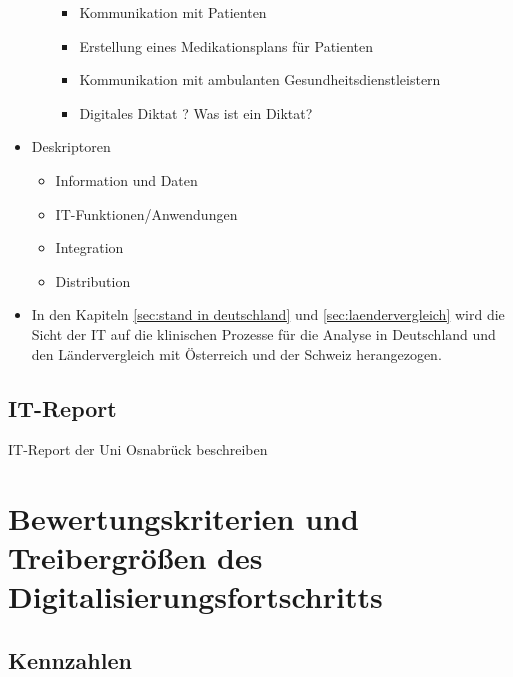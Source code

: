\begin{itemize}
\begin{itemize}
				\begin{itemize}
					\item Kommunikation mit Patienten
					\item Erstellung eines Medikationsplans für Patienten
					\item Kommunikation mit ambulanten Gesundheitsdienstleistern
					\item Digitales Diktat ? Was ist ein Diktat?
				\end{itemize}
			\end{itemize}
			\item Deskriptoren
		\begin{itemize} 
			\item Information und Daten
			\item IT-Funktionen/Anwendungen
			\item Integration
			\item Distribution
		\end{itemize}
		\item In den Kapiteln \ref{sec:stand in deutschland} und \ref{sec:laendervergleich} wird die Sicht der IT auf die klinischen Prozesse für die Analyse in Deutschland und den Ländervergleich mit Österreich und der Schweiz herangezogen.
		\end{itemize}
	\subsection{IT-Report}
	IT-Report der Uni Osnabrück beschreiben
\section{Bewertungskriterien und Treibergrößen des Digitalisierungsfortschritts}
	\subsection{Kennzahlen}
